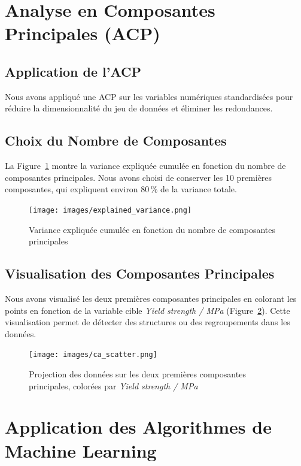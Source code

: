\documentclass{article}
\begin{document}
\section{Analyse en Composantes Principales (ACP)}

\subsection{Application de l'ACP}

Nous avons appliqué une ACP sur les variables numériques standardisées pour réduire la dimensionnalité du jeu de données et éliminer les redondances.

\subsection{Choix du Nombre de Composantes}

La Figure~\ref{fig:explained_variance} montre la variance expliquée cumulée en fonction du nombre de composantes principales. Nous avons choisi de conserver les 10 premières composantes, qui expliquent environ 80\,\% de la variance totale.

\begin{figure}[H]
    \centering
    \texttt{[image: images/explained\_variance.png]}
    \caption{Variance expliquée cumulée en fonction du nombre de composantes principales}
    \label{fig:explained_variance}
\end{figure}

\subsection{Visualisation des Composantes Principales}

Nous avons visualisé les deux premières composantes principales en colorant les points en fonction de la variable cible \textit{Yield strength / MPa} (Figure~\ref{fig:pca_scatter}). Cette visualisation permet de détecter des structures ou des regroupements dans les données.

\begin{figure}[H]
    \centering
    \texttt{[image: images/ca\_scatter.png]}
    \caption{Projection des données sur les deux premières composantes principales, colorées par \textit{Yield strength / MPa}}
    \label{fig:pca_scatter}
\end{figure}

\section{Application des Algorithmes de Machine Learning}
\end{document}
